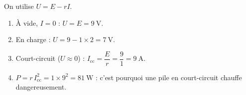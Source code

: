 \documentclass[11pt,a4paper]{article}
\begin{document}
\begin{corrige}
On utilise $U=E-rI$.
\begin{enumerate}[label=\alph*)]
  \item À vide, $I=0$ : $U=E=\qty{9}{\volt}$.
  \item En charge : $U=9-1\times2=\qty{7}{\volt}$.
  \item Court-circuit ($U\approx0$) : $I_{\text{cc}}=\dfrac{E}{r}=\dfrac{9}{1}=\qty{9}{\ampere}$.
  \item $P=r\,I_{\text{cc}}^{2}=1\times9^{2}=\qty{81}{\watt}$ : c'est pourquoi une pile en court-circuit
        chauffe dangereusement.
\end{enumerate}
\end{corrige}
\end{document}

